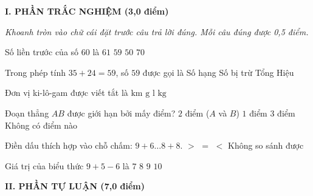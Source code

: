 
\setcounter{ex}{0}
\setcounter{bt}{0}

\textbf{\large I. PHẦN TRẮC NGHIỆM (3,0 điểm)}

{\itshape Khoanh tròn vào chữ cái đặt trước câu trả lời đúng. Mỗi câu đúng được 0,5 điểm.}

\begin{ex} %
Số liền trước của số $60$ là
\choice
{$61$}
{\True $59$}
{$50$}
{$70$}
\end{ex}

\begin{ex} %
Trong phép tính $35 + 24 = 59$, số $59$ được gọi là
\choice
{Số hạng}
{Số bị trừ}
{\True Tổng}
{Hiệu}
\end{ex}

\begin{ex} %
Đơn vị ki-lô-gam được viết tắt là
\choice
{$\text{km}$}
{$\text{g}$}
{$\text{l}$}
{\True $\text{kg}$}
\end{ex}

\begin{ex} %
Đoạn thẳng $AB$ được giới hạn bởi mấy điểm?
\choice
{\True $2$ điểm ($A$ và $B$)}
{$1$ điểm}
{$3$ điểm}
{Không có điểm nào}
\end{ex}

\begin{ex} %
Điền dấu thích hợp vào chỗ chấm: $9 + 6 \dots 8 + 8$.
\choice
{$>$}
{$=$}
{\True $<$}
{Không so sánh được}
\end{ex}

\begin{ex} %
Giá trị của biểu thức $9 + 5 - 6$ là
\choice
{$7$}
{\True $8$}
{$9$}
{$10$}
\end{ex}

\vspace{4mm}
\textbf{\large II. PHẦN TỰ LUẬN (7,0 điểm)}


